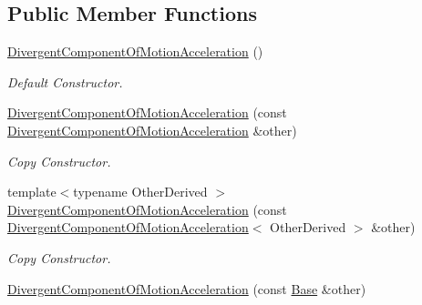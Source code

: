 \subsection*{Public Member Functions}
\begin{DoxyCompactItemize}
\item 
\hyperlink{classow__core_1_1DivergentComponentOfMotionAcceleration_a5ee9882124a0e2591b7fad122c542d42}{Divergent\+Component\+Of\+Motion\+Acceleration} ()\hypertarget{classow__core_1_1DivergentComponentOfMotionAcceleration_a5ee9882124a0e2591b7fad122c542d42}{}\label{classow__core_1_1DivergentComponentOfMotionAcceleration_a5ee9882124a0e2591b7fad122c542d42}

\begin{DoxyCompactList}\small\item\em Default Constructor. \end{DoxyCompactList}\item 
\hyperlink{classow__core_1_1DivergentComponentOfMotionAcceleration_a207612ec865fec743c4fcddef7785bd0}{Divergent\+Component\+Of\+Motion\+Acceleration} (const \hyperlink{classow__core_1_1DivergentComponentOfMotionAcceleration}{Divergent\+Component\+Of\+Motion\+Acceleration} \&other)\hypertarget{classow__core_1_1DivergentComponentOfMotionAcceleration_a207612ec865fec743c4fcddef7785bd0}{}\label{classow__core_1_1DivergentComponentOfMotionAcceleration_a207612ec865fec743c4fcddef7785bd0}

\begin{DoxyCompactList}\small\item\em Copy Constructor. \end{DoxyCompactList}\item 
{\footnotesize template$<$typename Other\+Derived $>$ }\\\hyperlink{classow__core_1_1DivergentComponentOfMotionAcceleration_ad5963f5a4564eba8ff4b7841137c4394}{Divergent\+Component\+Of\+Motion\+Acceleration} (const \hyperlink{classow__core_1_1DivergentComponentOfMotionAcceleration}{Divergent\+Component\+Of\+Motion\+Acceleration}$<$ Other\+Derived $>$ \&other)\hypertarget{classow__core_1_1DivergentComponentOfMotionAcceleration_ad5963f5a4564eba8ff4b7841137c4394}{}\label{classow__core_1_1DivergentComponentOfMotionAcceleration_ad5963f5a4564eba8ff4b7841137c4394}

\begin{DoxyCompactList}\small\item\em Copy Constructor. \end{DoxyCompactList}\item 
\hyperlink{classow__core_1_1DivergentComponentOfMotionAcceleration_afe60c42e60ad17174341a0abe58ef3a7}{Divergent\+Component\+Of\+Motion\+Acceleration} (const \hyperlink{classow__core_1_1LinearAcceleration}{Base} \&other)\hypertarget{classow__core_1_1DivergentComponentOfMotionAcceleration_afe60c42e60ad17174341a0abe58ef3a7}{}\label{classow__core_1_1DivergentComponentOfMotionAcceleration_afe60c42e60ad17174341a0abe58ef3a7}


\end{DoxyCompactItemize}
